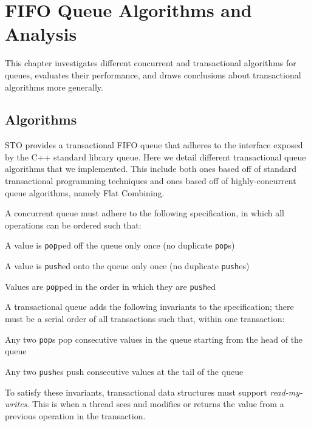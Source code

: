 \section{FIFO Queue Algorithms and Analysis}
\label{Queue}

This chapter investigates different concurrent and transactional algorithms for queues, evaluates their performance, and draws conclusions about transactional algorithms more generally.


\subsection{Algorithms}

STO provides a transactional FIFO queue that adheres to the interface exposed by the C++ standard library queue. Here we detail different transactional queue algorithms that we implemented. This include both ones based off of standard transactional programming techniques and ones based off of highly-concurrent queue algorithms, namely Flat Combining.

A concurrent queue must adhere to the following specification, in which all operations can be ordered such that:
\begin{bullets}
    \item A value is \texttt{pop}ped off the queue only once (no duplicate \texttt{pop}s)
    \item A value is \texttt{push}ed onto the queue only once (no duplicate \texttt{push}es)
    \item Values are \texttt{pop}ped in the order in which they are \texttt{push}ed
\end{bullets}

A transactional queue adds the following invariants to the specification; there must be a serial order of all transactions such that, within one transaction:
\begin{bullets}
    \item Any two \texttt{pop}s pop consecutive values in the queue starting from the head of the queue 
    \item Any two \texttt{push}es push consecutive values at the tail of the queue
\end{bullets}

To satisfy these invariants, transactional data structures must support \emph{read-my-writes}. This is when a thread sees and modifies or returns the value from a previous operation in the transaction.


